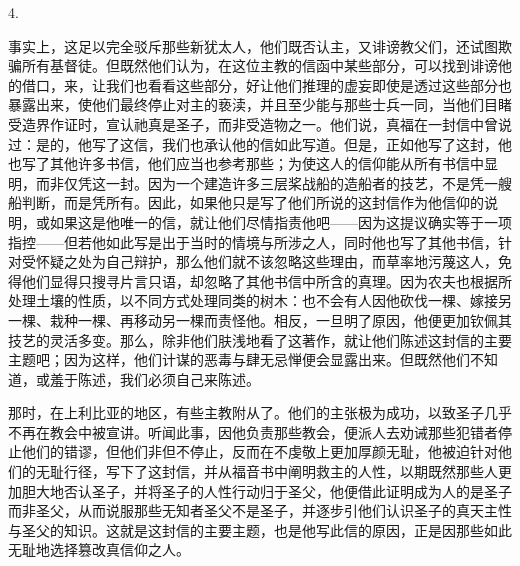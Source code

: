 4. \par

事实上，这足以完全驳斥那些新犹太人，他们既否认主，又诽谤教父们，还试图欺骗所有基督徒。但既然他们认为，在这位主教的信函中某些部分，可以找到诽谤他的借口，来，让我们也看看这些部分，好让他们推理的虚妄即使是透过这些部分也暴露出来，使他们最终停止对主的亵渎，并且至少能与那些士兵一同，当他们目睹受造界作证时，宣认祂真是圣子，而非受造物之一。他们说，真福在一封信中曾说过：是的，他写了这信，我们也承认他的信如此写道。但是，正如他写了这封，他也写了其他许多书信，他们应当也参考那些；为使这人的信仰能从所有书信中显明，而非仅凭这一封。因为一个建造许多三层桨战船的造船者的技艺，不是凭一艘船判断，而是凭所有。因此，如果他只是写了他们所说的这封信作为他信仰的说明，或如果这是他唯一的信，就让他们尽情指责他吧——因为这提议确实等于一项指控——但若他如此写是出于当时的情境与所涉之人，同时他也写了其他书信，针对受怀疑之处为自己辩护，那么他们就不该忽略这些理由，而草率地污蔑这人，免得他们显得只搜寻片言只语，却忽略了其他书信中所含的真理。因为农夫也根据所处理土壤的性质，以不同方式处理同类的树木：也不会有人因他砍伐一棵、嫁接另一棵、栽种一棵、再移动另一棵而责怪他。相反，一旦明了原因，他便更加钦佩其技艺的灵活多变。那么，除非他们肤浅地看了这著作，就让他们陈述这封信的主要主题吧；因为这样，他们计谋的恶毒与肆无忌惮便会显露出来。但既然他们不知道，或羞于陈述，我们必须自己来陈述。\par

\par

那时，在上利比亚的地区，有些主教附从了。他们的主张极为成功，以致圣子几乎不再在教会中被宣讲。听闻此事，因他负责那些教会，便派人去劝诫那些犯错者停止他们的错谬，但他们非但不停止，反而在不虔敬上更加厚颜无耻，他被迫针对他们的无耻行径，写下了这封信，并从福音书中阐明救主的人性，以期既然那些人更加胆大地否认圣子，并将圣子的人性行动归于圣父，他便借此证明成为人的是圣子而非圣父，从而说服那些无知者圣父不是圣子，并逐步引他们认识圣子的真天主性与圣父的知识。这就是这封信的主要主题，也是他写此信的原因，正是因那些如此无耻地选择篡改真信仰之人。\par

\par

